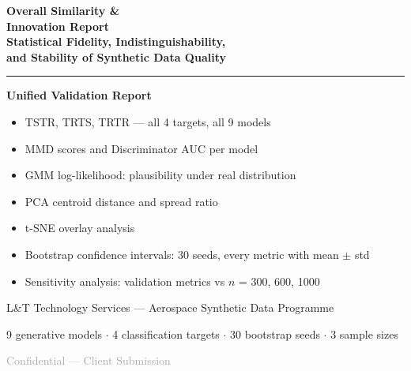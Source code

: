 \documentclass[12pt,a4paper]{article}
\begin{document}
\begin{titlepage}
\centering
\vspace*{2cm}
{\fontsize{26}{32}\selectfont\bfseries\color{primary}
  Overall Similarity \&\\Innovation Report\\[0.4em]
  \large\color{darkgray} Statistical Fidelity, Indistinguishability,\\
  and Stability of Synthetic Data Quality
}\par
\vspace{1.2cm}
\textcolor{accent}{\rule{10cm}{2pt}}\par
\vspace{0.8cm}
{\Large\bfseries Unified Validation Report}\par
\vspace{1.8cm}
\begin{tcolorbox}[insightbox, title={Report Coverage}, width=13cm]
\begin{itemize}[noitemsep]
  \item TSTR, TRTS, TRTR --- all 4 targets, all 9 models
  \item MMD scores and Discriminator AUC per model
  \item GMM log-likelihood: plausibility under real distribution
  \item PCA centroid distance and spread ratio
  \item t-SNE overlay analysis
  \item Bootstrap confidence intervals: 30 seeds, every metric with mean $\pm$ std
  \item Sensitivity analysis: validation metrics vs $n$ = 300, 600, 1000
\end{itemize}
\end{tcolorbox}
\vspace{1.8cm}
{\large L\&T Technology Services --- Aerospace Synthetic Data Programme}\par
\vspace{0.3cm}
{\normalsize\color{darkgray} 9 generative models $\cdot$ 4 classification targets $\cdot$ 30 bootstrap seeds $\cdot$ 3 sample sizes}\par
\vfill
\textcolor{darkgray}{\small Confidential --- Client Submission}
\end{titlepage}

\tableofcontents
\newpage

\end{document}
